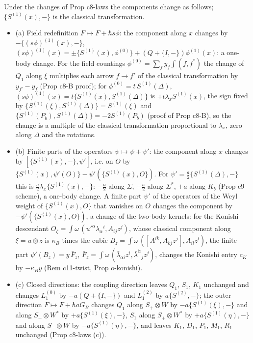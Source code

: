 \begin{proposition}
\label{prop:qs-laws}
Under the changes of Prop c8-laws the components change as follows; $\{S^{(1)}(x),-\}$ is the classical transformation.
\begin{itemize}
\item (a) Field redefinition $F\mapsto F+\hbar s\phi$: the component along $x$ changes by $-\{(s\phi)^{(1)}(x),-\}$, $(s\phi)^{(1)}(x)=\pm\{S^{(1)}(x),\phi^{(0)}\}+(Q+\{I,-\})\phi^{(1)}(x)$: a one-body change. For the field countings $\phi^{(0)}=\sum_fy_f\int(f,f^*)$ the change of $Q_1$ along $\xi$ multiplies each arrow $f\to f'$ of the classical transformation by $y_{f'}-y_f$ (Prop c8-B proof); for $\phi^{(0)}=t\,S^{(1)}(\Delta)$, $(s\phi)^{(1)}(x)=t\{S^{(1)}(x),S^{(1)}(\Delta)\}$ is $\pm t\lambda_x S^{(1)}(x)$, the sign fixed by $\{S^{(1)}(\xi),S^{(1)}(\Delta)\}=S^{(1)}(\xi)$ and $\{S^{(1)}(P_b),S^{(1)}(\Delta)\}=-2S^{(1)}(P_b)$ (proof of Prop c8-B), so the change is a multiple of the classical transformation proportional to $\lambda_x$, zero along $\Delta$ and the rotations.
\item (b) Finite parts of the operators $\psi\mapsto\psi+\psi'$: the component along $x$ changes by $[\{S^{(1)}(x),-\},\psi']$, i.e. on $O$ by $\{S^{(1)}(x),\psi'(O)\}-\psi'(\{S^{(1)}(x),O\})$. For $\psi'=\tfrac a2\{S^{(1)}(\Delta),-\}$ this is $\tfrac a2\lambda_x\{S^{(1)}(x),-\}$: $-\tfrac a2$ along $\Sigma$, $+\tfrac a2$ along $\Sigma^*$, $+a$ along $K_b$ (Prop c9-scheme), a one-body change. A finite part $\psi'$ of the operators of the Weyl weight of $\{S^{(1)}(x),O\}$ that vanishes on $O$ changes the component by $-\psi'(\{S^{(1)}(x),O\})$, a change of the two-body kernels: for the Konishi descendant $O_\zeta=\int\omega\,(u'^\alpha\lambda_\alpha{}^i,A_{ij}z^j)$, whose classical component along $\xi=u\otimes z$ is $\kappa_B$ times the cubic $B_z=\int\omega\,([A^{ik},A_{kj}z^j],A_{il}z^l)$, the finite part $\psi'(B_z)=y\,\bar F_z$, $\bar F_z=\int\omega\,(\bar\lambda_{\dot\alpha i}z^i,\bar\lambda^{\dot\alpha}{}_jz^j)$, changes the Konishi entry $c_K$ by $-\kappa_By$ (Rem c11-twist, Prop o-konishi).
\item (c) Closed directions: the coupling direction leaves $Q_1$, $S_1$, $K_1$ unchanged and changes $L_1^{(0)}$ by $-a(Q+\{I,-\})$ and $L_1^{(2)}$ by $a\{S^{(2)},-\}$; the outer direction $F\mapsto F+\hbar aG_B$ changes $Q_1$ along $S_+\otimes W$ by $-a\{S^{(1)}(\xi),-\}$ and along $S_-\otimes W^*$ by $+a\{S^{(1)}(\xi),-\}$, $S_1$ along $S_+\otimes W^*$ by $+a\{S^{(1)}(\eta),-\}$ and along $S_-\otimes W$ by $-a\{S^{(1)}(\eta),-\}$, and leaves $K_1$, $D_1$, $P_1$, $M_1$, $R_1$ unchanged (Prop c8-laws (c)).

\end{itemize}
\end{proposition}
